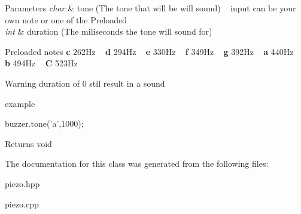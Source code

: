 \begin{DoxyParams}{Parameters}
{\em char} & tone (The tone that will be will sound) ~\newline
 input can be your own note or one of the Preloaded \\
\hline
{\em int} & duration (The miliseconds the tone will sound for)\\
\hline
\end{DoxyParams}
\begin{DoxyParagraph}{Preloaded notes}
{\bfseries c} 262\+Hz ~\newline
 {\bfseries d} 294\+Hz ~\newline
 {\bfseries e} 330\+Hz ~\newline
 {\bfseries f} 349\+Hz ~\newline
 {\bfseries g} 392\+Hz ~\newline
 {\bfseries a} 440\+Hz ~\newline
 {\bfseries b} 494\+Hz ~\newline
 {\bfseries C} 523\+Hz ~\newline
 
\end{DoxyParagraph}
\begin{DoxyWarning}{Warning}
duration of 0 stil result in a sound
\end{DoxyWarning}
\begin{DoxyParagraph}{example}

\begin{DoxyCode}
buzzer.tone(\textcolor{charliteral}{'a'},1000);
\end{DoxyCode}
 
\end{DoxyParagraph}
\begin{DoxyReturn}{Returns}
void 
\end{DoxyReturn}


The documentation for this class was generated from the following files\+:\begin{DoxyCompactItemize}
\item 
piezo.\+hpp\item 
piezo.\+cpp\end{DoxyCompactItemize}
